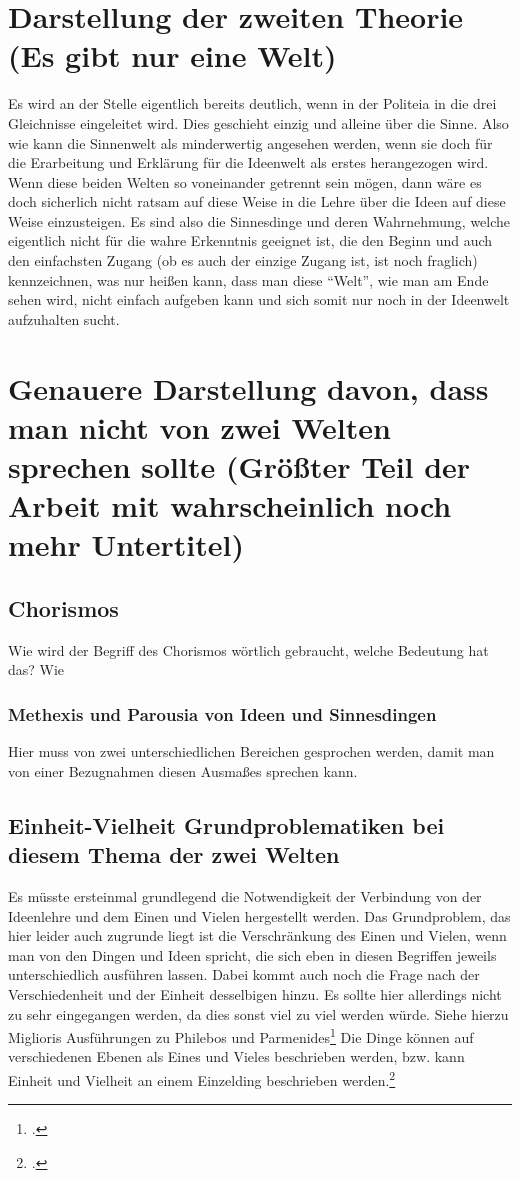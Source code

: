 \documentclass[12pt]{article}
\begin{document}
\section{Darstellung der zweiten Theorie (Es gibt nur eine Welt)}
Es wird an der Stelle eigentlich bereits deutlich, wenn in der Politeia in die drei Gleichnisse eingeleitet wird. Dies geschieht einzig und alleine über die Sinne. Also wie kann die Sinnenwelt als minderwertig angesehen werden, wenn sie doch für die Erarbeitung und Erklärung für die Ideenwelt als erstes herangezogen wird.
Wenn diese beiden Welten so voneinander getrennt sein mögen, dann wäre es doch sicherlich nicht ratsam auf diese Weise in die Lehre über die Ideen auf diese Weise einzusteigen. Es sind also die Sinnesdinge und deren Wahrnehmung, welche eigentlich nicht für die wahre Erkenntnis geeignet ist, die den Beginn und auch den einfachsten Zugang (ob es auch der einzige Zugang ist, ist noch fraglich) kennzeichnen, was nur heißen kann, dass man diese \enquote{Welt}, wie man am Ende sehen wird, nicht einfach aufgeben kann und sich somit nur noch in der Ideenwelt aufzuhalten sucht.
\section{Genauere Darstellung davon, dass man nicht von zwei Welten sprechen sollte (Größter Teil der Arbeit mit wahrscheinlich noch mehr Untertitel)}
\subsection{Chorismos}
Wie wird der Begriff des Chorismos wörtlich gebraucht, welche Bedeutung hat das? Wie 


\subsubsection{Methexis und Parousia von Ideen und Sinnesdingen}
Hier muss von zwei unterschiedlichen Bereichen gesprochen werden, damit man von einer Bezugnahmen diesen Ausmaßes sprechen kann. 
\subsection{Einheit-Vielheit Grundproblematiken bei diesem Thema der zwei Welten}
Es müsste ersteinmal grundlegend die Notwendigkeit der Verbindung von der Ideenlehre und dem Einen und Vielen hergestellt werden. 
Das Grundproblem, das hier leider auch zugrunde liegt ist die Verschränkung des Einen und Vielen, wenn man von den Dingen und Ideen spricht, die sich eben in diesen Begriffen jeweils unterschiedlich ausführen lassen. Dabei kommt auch noch die Frage nach der Verschiedenheit und der Einheit desselbigen hinzu.
Es sollte hier allerdings nicht zu sehr eingegangen werden, da dies sonst viel zu viel werden würde.
Siehe hierzu Miglioris Ausführungen zu Philebos und Parmenides\footcite[vgl.][S. 110ff.]{Migliori}
Die Dinge können auf verschiedenen Ebenen als Eines und Vieles beschrieben werden, bzw. kann Einheit und Vielheit an einem Einzelding beschrieben werden.\footcite[vgl.][S. 112]{Migliori}
\end{document}
